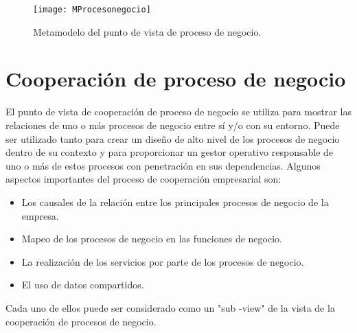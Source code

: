 \begin{figure}[H]
\centering
\texttt{[image: MProcesonegocio]}
\caption{Metamodelo del punto de vista de proceso de negocio.}
\end{figure}



\section{Cooperación de proceso de negocio}
El punto de vista de cooperación de proceso de negocio se utiliza para mostrar las relaciones de uno o más procesos de negocio entre sí y/o con su entorno. Puede ser utilizado tanto para crear un diseño de alto nivel de los procesos de negocio dentro de su contexto y para proporcionar un gestor operativo responsable de uno o más de estos procesos con penetración en sus dependencias. Algunos aspectos importantes del proceso de cooperación empresarial son:
\begin{itemize}
        \item Los causales de la relación entre los principales procesos de negocio de la empresa.
        \item Mapeo de los procesos de negocio en las funciones de negocio. 
        \item La realización de los servicios por parte de los procesos de negocio.
        \item El uso de datos compartidos.
\end{itemize}
Cada uno de ellos puede ser considerado como un "sub -view" de la vista de la cooperación de procesos de negocio.

